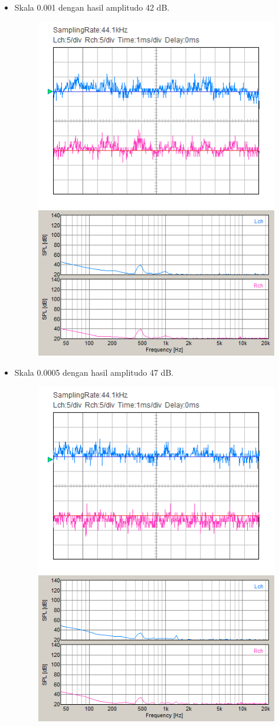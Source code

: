 \documentclass[12pt,]{article}
\begin{document}
\begin{itemize}
		\item Skala 0.001 dengan hasil amplitudo 42 dB.
		\begin{figure}[H]
			\centering
			\includegraphics[width=0.45\linewidth]{result/day_4/500Hz/tone0001}
			\includegraphics[width=0.45\linewidth]{result/day_4/500Hz/fft_tone0001}
		\end{figure}
	
		\item Skala 0.0005 dengan hasil amplitudo 47 dB.
		\begin{figure}[H]
			\centering
			\includegraphics[width=0.45\linewidth]{result/day_4/500Hz/tone00005}
			\includegraphics[width=0.45\linewidth]{result/day_4/500Hz/fft_tone00005}
		\end{figure}
	

\end{itemize}
\end{document}

